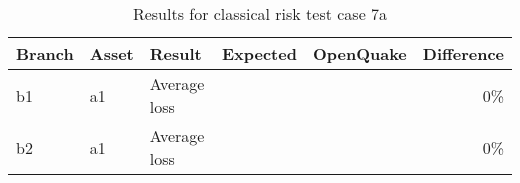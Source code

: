 \begin{table}[htbp]

\centering
\begin{tabular}{ l l l r r r }

\hline
\rowcolor{anti-flashwhite}
\bf{Branch} & \bf{Asset} & \bf{Result} & \bf{Expected} & \bf{OpenQuake} & \bf{Difference}\\
\hline
b1 & a1 & Average loss &  &  & 0\% \\
b2 & a1 & Average loss &  &  & 0\% \\
\hline
\end{tabular}

\caption{Results for classical risk test case 7a}
\label{tab:result-cr-7a}
\end{table}
